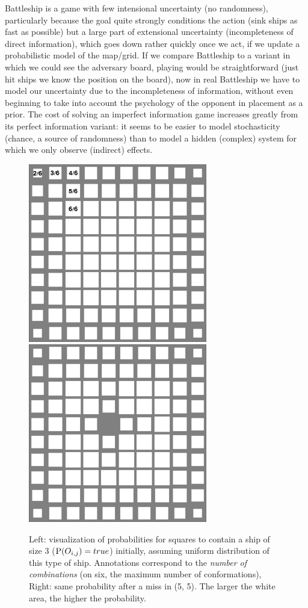 Battleship is a game with few intensional uncertainty (no randomness), particularly because the goal quite strongly conditions the action (sink ships as fast as possible) but a large part of extensional uncertainty (incompleteness of direct information), which goes down rather quickly once we act, if we update a probabilistic model of the map/grid. If we compare Battleship to a variant in which we could see the adversary board, playing would be straightforward (just hit ships we know the position on the board), now in real Battleship we have to model our uncertainty due to the incompleteness of information, without even beginning to take into account the psychology of the opponent in placement as a prior. The cost of solving an imperfect information game increases greatly from its perfect information variant: it seems to be easier to model stochasticity (chance, a source of randomness) than to model a hidden (complex) system for which we only observe (indirect) effects.

\begin{figure}[h!]
\begin{center}
\includegraphics[width=7.8cm]{images/battleship_board_3_init_annotated.png} \includegraphics[width=7.8cm]{images/battleship_board_3_1miss.png}
\caption{Left: visualization of probabilities for squares to contain a ship of size 3 ($\mathrm{P}(O_{i,j})=true$) initially, assuming uniform distribution of this type of ship. Annotations correspond to the \textit{number of combinations} (on six, the maximum number of conformations), Right: same probability after a miss in (5, 5). The larger the white area, the higher the probability.}
\label{fig:battleship}
\end{center}
\end{figure}



